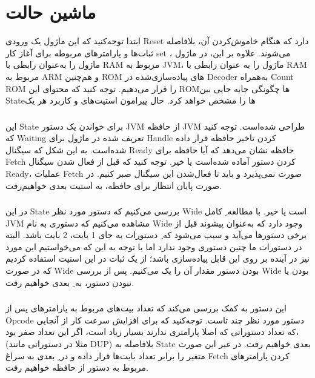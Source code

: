 \section*{
ماشین حالت
}
ابتدا توجه‌کنید که این ماژول یک ورودی Reset دارد که هنگام خاموش‌کردن آن، بلافاصله ثبات‌ها و پارامترهای مربوطه برای آغاز کار set می‌شوند. علاوه بر این، در ماژول
،
ماژول
را به‌عنوان
رابطی با RAM مربوط به JVM، ماژول
را به عنوان رابطی با RAM مربوط به ARM و هم‌چنین ROM های پیاده‌سازی‌شده در Decoder به‌همراه Count ROM را قرار می‌دهیم. توجه کنید که محتوای این ROMها چگونگی جابه جایی بین Stateها را مشخص خواهد کرد.
حال پیرامون استیت‌های
و کاربرد هر یک
\subsubsection*{}
این State برای خواندن یک دستور JVM از حافظه JVM طراحی شده‌است. توجه کنید که Waiting تعریف شده در ماژول 
برای Handle کردن تاخیر حافظه قرار داده شده‌است. به این شکل که سیگنال Ready حافظه نشان می‌دهد که آیا حافظه برای Fetch کردن دستور آماده شده‌است یا خیر. توجه کنید که قبل از فعال شدن سیگنال Ready، عملیات Fetch صورت نمی‌پذیرد و باید تا فعال‌شدن این سیگنال صبر کنیم. در صورت پایان انتظار برای حافظه، به استیت بعدی خواهیم‌رفت.

\subsubsection*{}
در این State بررسی می‌کنیم که دستور مورد نظر Wide است یا خیر. با مطالعه 
ِ
کامل
JVM 
مشاهده می‌کنیم که دستوری به نام Wide وجود دارد که به‌عنوان پیشوند قبل از برخی دستورها می‌آید و سبب می‌شود که 
ِ
دستورات به جای 1 بایت، 2 بایت باشد. البته در دستورات ما چنین دستوری وجود ندارد اما با توجه به این که می‌خواستیم این مورد نیز در آینده بر روی این
قابل پیاده‌سازی باشد؛ از یک ثبات در این استیت استفاده کردیم که در صورت Wide بودن دستور مقدار آن را یک می‌کنیم. پس از بررسی Wide بودن یا نبودن دستور، به 
ِ
بعدی خواهیم رفت.
\subsubsection*{}
این دستور به کمک
بررسی می‌کند که تعداد بیت‌های مربوط به پارامترهای پس از Opcode دستور مورد نظر چند تاست. توجه‌کنید که برای افزایش سرعت کار از آنجایی که تعداد دستوراتی که اصلا پارامتری ندارند بسیار زیاد است، اگر این تعداد صفر بود،(مثلا در دستوراتی مانند DUP) بلافاصله به State بعدی خواهیم رفت. در غیر این صورت متغیر
را برابر تعداد بایت‌ها قرار داده و در
ِ
بعدی به سراغ Fetch کردن پارامترهای مربوط به دستور از حافظه خواهیم رفت.

